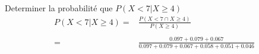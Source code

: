 \begin{exo}
\begin{subexo}{Determiner la probabilité que $P(X < 7 | X \ge 4)$}
    \begin{align*}
      P(X < 7 | X \ge 4) =& \frac{P(X < 7 \cap X \ge 4)}{P(X \ge 4)} \\\\
      =& \frac{0.097 + 0.079 + 0.067}{0.097 +0.079 + 0.067 + 0.058 + 0.051 +  0.046 }
    \end{align*}
  \end{subexo}
\end{exo}

